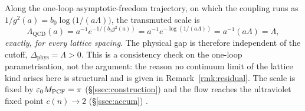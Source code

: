 \begin{corollary}\label{cor:survive}
Along the one-loop asymptotic-freedom trajectory, on which the coupling runs as
$1/g^{2}(a)=b_0\log\!\big(1/(a\Lambda)\big)$, the transmuted scale is
\begin{equation}\label{gap_survives_transmutation}
  \Lambda_{\mathrm{QCD}}(a)=a^{-1}e^{-1/(b_0g^{2}(a))}
  =a^{-1}e^{-\log(1/(a\Lambda))}=a^{-1}(a\Lambda)=\Lambda ,
\end{equation}
\emph{exactly, for every lattice spacing}. The physical gap is therefore independent of the cutoff,
$\Delta_{\mathrm{phys}}=\Lambda>0$. This is a consistency check on the one-loop parametrisation, not
the argument: the reason no continuum limit of the lattice kind arises here is structural and is given
in Remark~\ref{rmk:residual}. The scale
is fixed by $\varepsilon_0M_{\mathrm{PCF}}=\pi$ (\S\ref*{ssec:construction}) and the flow reaches the
ultraviolet fixed point $c(n)\to2$ (\S\ref*{ssec:accum}) .

\end{corollary}

